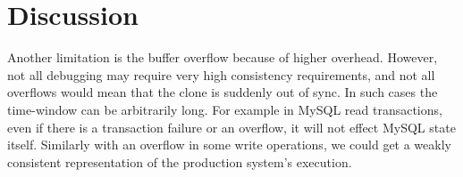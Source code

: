 
\section{Discussion}
\label{sec:discussion}




Another limitation is the buffer overflow because of higher overhead. 
However, not all debugging may require very high consistency requirements, and not all overflows would mean that the clone is suddenly out of sync. 
In such cases the time-window can be arbitrarily long. 
For example in MySQL read transactions, even if there is a transaction failure or an overflow, it will not effect MySQL state itself.
Similarly with an overflow in some write operations, we could get a weakly consistent representation of the production system's execution.
\fi

